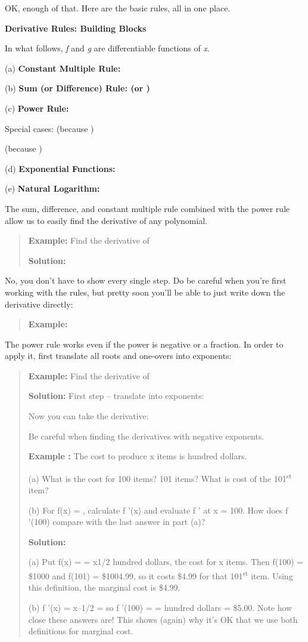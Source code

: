 OK, enough of that. Here are the basic rules, all in one place.

\textbf{Derivative Rules: Building Blocks}

In what follows, \emph{f} and \emph{g} are differentiable functions of
\emph{x}.

(a) \textbf{Constant Multiple Rule:}

(b) \textbf{Sum (or Difference) Rule: (or )}

(c) \textbf{Power Rule: }

Special cases: (because )

(because )

(d) \textbf{Exponential Functions: }

(e) \textbf{Natural Logarithm:}

The sum, difference, and constant multiple rule combined with the power
rule allow us to easily find the derivative of any polynomial.

\begin{quote}
\textbf{Example:} Find the derivative of

\textbf{Solution: }
\end{quote}

No, you don't have to show every single step. Do be careful when you're
first working with the rules, but pretty soon you'll be able to just
write down the derivative directly:

\begin{quote}
\textbf{Example:}
\end{quote}

The power rule works even if the power is negative or a fraction. In
order to apply it, first translate all roots and one-overs into
exponents:

\begin{quote}
\textbf{Example:} Find the derivative of

\textbf{Solution:} First step -- translate into exponents:

Now you can take the derivative:

Be careful when finding the derivatives with negative exponents.

\textbf{Example :} The cost to produce x items is hundred dollars.

(a) What is the cost for 100 items? 101 items? What is cost of the
101\textsuperscript{st} item?

(b) For f(x) = , calculate f '(x) and evaluate f ' at x = 100. How does
f '(100) compare with the last answer in part (a)?

\textbf{Solution:}

(a) Put f(x) = = x1/2 hundred dollars, the cost for x items. Then f(100)
= \$1000 and f(101) = \$1004.99, so it costs \$4.99 for that
101\textsuperscript{st} item. Using this definition, the marginal cost
is \$4.99.

(b) f '(x) = x--1/2 = so f '(100) = = hundred dollars = \$5.00. Note how
close these answers are! This shows (again) why it's OK that we use both
definitions for marginal cost.
\end{quote}


